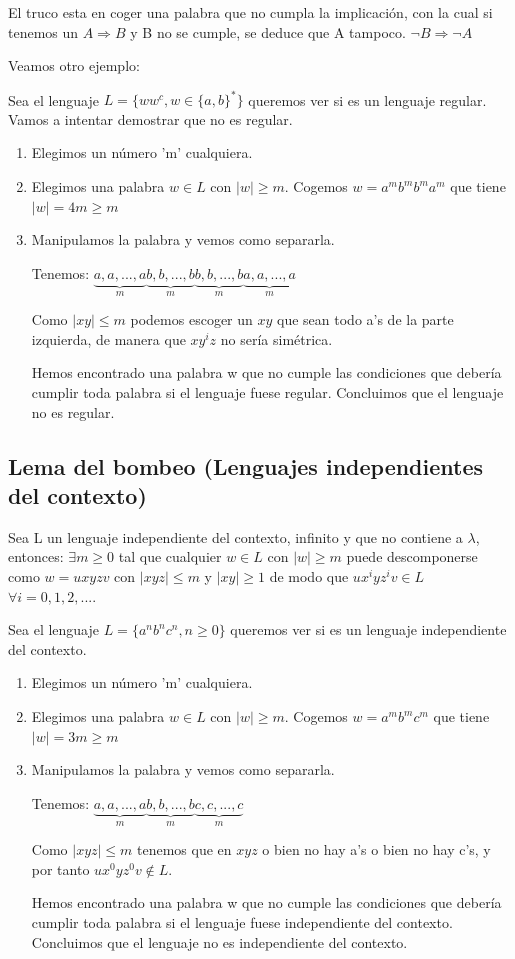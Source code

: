 \documentclass{apuntes}
\begin{document}
El truco esta en coger una palabra que no cumpla la implicación, con la cual si tenemos un $A \Rightarrow B$ y B no se cumple, se deduce que A tampoco. $\neg B \Rightarrow \neg A $

Veamos otro ejemplo:

\begin{example}
Sea el lenguaje $L=\{ww^c,  w\in \{a,b\}^*\}$ queremos ver si es un lenguaje regular. Vamos a intentar demostrar que no es regular.
\begin{enumerate}

\item Elegimos un número 'm' cualquiera.
\item Elegimos una palabra $w\in L$ con $|w| \geq m$. Cogemos $w=a^m b^m b^m a^m$ que tiene $|w|= 4m \geq m$
\item Manipulamos la palabra y vemos como separarla.

Tenemos: $\underbrace{a,a,...,a}_m \underbrace{b,b,...,b}_{m} \underbrace{b,b,...,b}_m \underbrace{a,a,...,a}_m$

Como $|xy| \leq m$ podemos escoger un $xy$ que sean todo a's de la parte izquierda, de manera que $xy^iz$ no sería simétrica.

Hemos encontrado una palabra w que no cumple las condiciones que debería cumplir toda palabra si el lenguaje fuese regular. Concluimos que el lenguaje no es regular.
\end{enumerate}
\end{example}


\subsection{Lema del bombeo (Lenguajes independientes del contexto)}
Sea L un lenguaje independiente del contexto, infinito y que no contiene a $\lambda$, entonces: $\exists m\geq 0$ tal que cualquier $w\in L$ con $|w| \geq m$ puede descomponerse como $w=uxyzv$ con $|xyz|\leq m$ y $|xy|\geq 1$ de modo que $ux^iyz^iv \in L$ $\forall i=0,1,2,...$.

\begin{example}
Sea el lenguaje $L=\{a^nb^nc^n, n\geq 0\}$ queremos ver si es un lenguaje independiente del contexto.
\begin{enumerate}

\item Elegimos un número 'm' cualquiera.
\item Elegimos una palabra $w\in L$ con $|w| \geq m$. Cogemos $w=a^mb^mc^m$ que tiene $|w|= 3m \geq m$
\item Manipulamos la palabra y vemos como separarla.

Tenemos: $\underbrace{a,a,...,a}_m \underbrace{b,b,...,b}_m \underbrace{c,c,...,c}_m$

Como $|xyz| \leq m$ tenemos que en $xyz$ o bien no hay a's o bien no hay c's, y por tanto $ux^0yz^0v \notin L$.

Hemos encontrado una palabra w que no cumple las condiciones que debería cumplir toda palabra si el lenguaje fuese independiente del contexto. Concluimos que el lenguaje no es independiente del contexto.
\end{enumerate}
\end{example}
\end{document}
